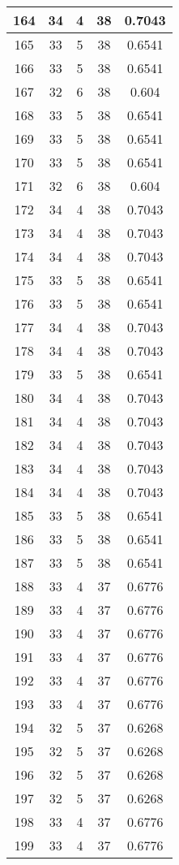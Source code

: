 \documentclass[letterpaper, 12pt]{article}
\begin{document}
\begin{longtable}{|c|c|c|c|c|}
\hline
164 & 34 & 4 & 38 & 0.7043 \\
\hline
165 & 33 & 5 & 38 & 0.6541 \\
\hline
166 & 33 & 5 & 38 & 0.6541 \\
\hline
167 & 32 & 6 & 38 & 0.604 \\
\hline
168 & 33 & 5 & 38 & 0.6541 \\
\hline
169 & 33 & 5 & 38 & 0.6541 \\
\hline
170 & 33 & 5 & 38 & 0.6541 \\
\hline
171 & 32 & 6 & 38 & 0.604 \\
\hline
172 & 34 & 4 & 38 & 0.7043 \\
\hline
173 & 34 & 4 & 38 & 0.7043 \\
\hline
174 & 34 & 4 & 38 & 0.7043 \\
\hline
175 & 33 & 5 & 38 & 0.6541 \\
\hline
176 & 33 & 5 & 38 & 0.6541 \\
\hline
177 & 34 & 4 & 38 & 0.7043 \\
\hline
178 & 34 & 4 & 38 & 0.7043 \\
\hline
179 & 33 & 5 & 38 & 0.6541 \\
\hline
180 & 34 & 4 & 38 & 0.7043 \\
\hline
181 & 34 & 4 & 38 & 0.7043 \\
\hline
182 & 34 & 4 & 38 & 0.7043 \\
\hline
183 & 34 & 4 & 38 & 0.7043 \\
\hline
184 & 34 & 4 & 38 & 0.7043 \\
\hline
185 & 33 & 5 & 38 & 0.6541 \\
\hline
186 & 33 & 5 & 38 & 0.6541 \\
\hline
187 & 33 & 5 & 38 & 0.6541 \\
\hline
188 & 33 & 4 & 37 & 0.6776 \\
\hline
189 & 33 & 4 & 37 & 0.6776 \\
\hline
190 & 33 & 4 & 37 & 0.6776 \\
\hline
191 & 33 & 4 & 37 & 0.6776 \\
\hline
192 & 33 & 4 & 37 & 0.6776 \\
\hline
193 & 33 & 4 & 37 & 0.6776 \\
\hline
194 & 32 & 5 & 37 & 0.6268 \\
\hline
195 & 32 & 5 & 37 & 0.6268 \\
\hline
196 & 32 & 5 & 37 & 0.6268 \\
\hline
197 & 32 & 5 & 37 & 0.6268 \\
\hline
198 & 33 & 4 & 37 & 0.6776 \\
\hline
199 & 33 & 4 & 37 & 0.6776 \\
\hline
\end{longtable}
\end{document}
